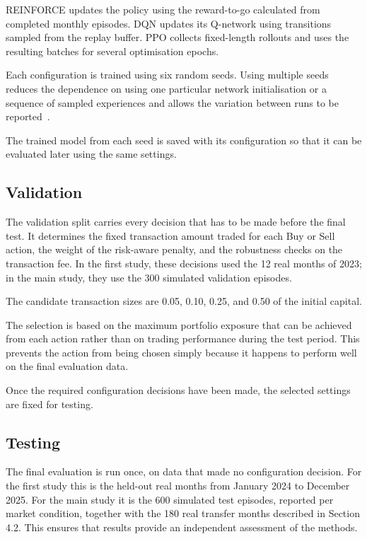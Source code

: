 REINFORCE updates the policy using the reward-to-go calculated from
completed monthly episodes. DQN updates its Q-network using transitions
sampled from the replay buffer. PPO collects fixed-length rollouts and
uses the resulting batches for several optimisation epochs.

Each configuration is trained using six random seeds. Using multiple
seeds reduces the dependence on using one particular network
initialisation or a sequence of sampled experiences and allows the variation between runs to be reported~\cite{henderson2018}.

The trained model from each seed is saved with its configuration so that
it can be evaluated later using the same settings.

\subsection{Validation}

The validation split carries every decision that has to be made before
the final test. It determines the fixed transaction amount traded for
each Buy or Sell action, the weight of the risk-aware penalty, and the
robustness checks on the transaction fee. In the first study, these decisions
used the 12 real months of 2023; in the main study, they use the 300
simulated validation episodes.

The candidate transaction sizes are 0.05, 0.10, 0.25, and 0.50 of the
initial capital.

The selection is based on the maximum portfolio exposure that can be
achieved from each action rather than on trading performance during the
test period. This prevents the action from being chosen simply because
it happens to perform well on the final evaluation data.

Once the required configuration decisions have been made, the selected
settings are fixed for testing.

\subsection{Testing}

The final evaluation is run once, on data that made no configuration
decision. For the first study this is the held-out real months from January
2024 to December 2025. For the main study it is the 600 simulated test
episodes, reported per market condition, together with the 180 real
transfer months described in Section 4.2. This ensures that results
provide an independent assessment of the methods.

